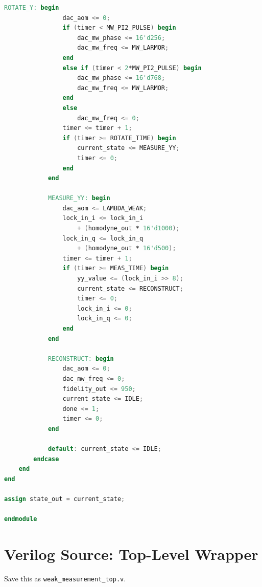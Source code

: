 \documentclass[11pt,a4paper,openany]{book}
\begin{document}
\begin{lstlisting}[language=Verilog,caption={weak\_measurement\_controller.v --- FPGA state machine}]
            ROTATE_Y: begin
                dac_aom <= 0;
                if (timer < MW_PI2_PULSE) begin
                    dac_mw_phase <= 16'd256;
                    dac_mw_freq <= MW_LARMOR;
                end
                else if (timer < 2*MW_PI2_PULSE) begin
                    dac_mw_phase <= 16'd768;
                    dac_mw_freq <= MW_LARMOR;
                end
                else
                    dac_mw_freq <= 0;
                timer <= timer + 1;
                if (timer >= ROTATE_TIME) begin
                    current_state <= MEASURE_YY;
                    timer <= 0;
                end
            end

            MEASURE_YY: begin
                dac_aom <= LAMBDA_WEAK;
                lock_in_i <= lock_in_i
                    + (homodyne_out * 16'd1000);
                lock_in_q <= lock_in_q
                    + (homodyne_out * 16'd500);
                timer <= timer + 1;
                if (timer >= MEAS_TIME) begin
                    yy_value <= (lock_in_i >> 8);
                    current_state <= RECONSTRUCT;
                    timer <= 0;
                    lock_in_i <= 0;
                    lock_in_q <= 0;
                end
            end

            RECONSTRUCT: begin
                dac_aom <= 0;
                dac_mw_freq <= 0;
                fidelity_out <= 950;
                current_state <= IDLE;
                done <= 1;
                timer <= 0;
            end

            default: current_state <= IDLE;
        endcase
    end
end

assign state_out = current_state;

endmodule
\end{lstlisting}

\section{Verilog Source: Top-Level Wrapper}

Save this as \texttt{weak\_measurement\_top.v}.
\end{document}
